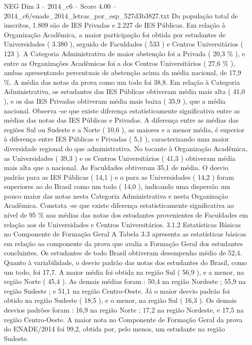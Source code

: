 \begin{textsample}{NEG Dim 3 – 2014\_c6 – Score 4.00 – 2014\_c6/enade\_2014\_letras\_por\_esp\_527d3b3827.txt}
Da população total de inscritos, 1.809 são de IES Privadas e 2.227 de IES Públicas.
Em relação à Organização Acadêmica, a maior participação foi obtida por estudantes de Universidades ( 3.380 ), seguido de Faculdades ( 533 ) e Centros Universitários ( 123 ).
A Categoria Administrativa de maior abstenção foi a Privada ( 20,3 \% ), e entre as Organizações Acadêmicas foi a dos Centros Universitários ( 27,6 \% ), ambas apresentando percentuais de abstenção acima da média nacional, de 17,9 \%.
A média das notas da prova como um todo foi 38,8.
Em relação à Categoria Administrativa, os estudantes das IES Públicas obtiveram média mais alta ( 41,0 ), e os das IES Privadas obtiveram média mais baixa ( 35,9 ), que a média nacional.
Observa -se que existe diferença estatisticamente significativa entre as médias das notas das IES Públicas e Privadas.
A diferença entre as médias das regiões Sul ou Sudeste e a Norte ( 10,6 ), as maiores e a menor média, é superior à diferença entre IES Públicas e Privadas ( 5,1 ), caracterizando uma maior diversidade regional do que administrativa.
No tocante à Organização Acadêmica, as Universidades ( 39,3 ) e os Centros Universitários ( 41,3 ) obtiveram média mais alta que a nacional.
As Faculdades obtiveram 35,1 de média.
O desvio padrão para as IES Públicas ( 14,1 ) e o para as Universidades ( 14,2 ) foram superiores ao do Brasil como um todo ( 14,0 ), indicando uma dispersão um pouco maior das notas nesta Categoria Administrativa e nesta Organização Acadêmica.
Constata -se que existe diferença estatisticamente significativa ao nível de 95 \% nas médias das notas dos estudantes provenientes de Faculdades em relação aos de Universidades e Centros Universitários. 3.1.2 Estatísticas Básicas no Componente de Formação Geral A Tabela 3.3 apresenta as estatísticas básicas em relação ao componente da prova que avalia a Formação Geral dos estudantes concluintes.
Os estudantes de todo Brasil obtiveram desempenho médio de 52,4.
Quanto à variabilidade, o desvio padrão das notas dos estudantes do Brasil, como um todo, foi 17,7.
A maior média foi obtida na região Sul ( 56,9 ), e a menor, na região Norte ( 45,4 ).
As demais médias foram : 50,4 na região Nordeste ; 55,9 na região Sudeste ; e 51,1 na região Centro-Oeste.
Já o maior desvio padrão foi obtido na região Sudeste ( 18,5 ), e o menor, na região Sul ( 16,3 ).
Os demais desvios padrões foram : 16,9 na região Norte ; 17,2 na região Nordeste, e 17,5 na região Centro-Oeste.
A maior nota no Componente de Formação Geral da prova do ENADE/2014 foi 99,2, obtida por, pelo menos, um estudante na região Sudeste.

\end{textsample}

